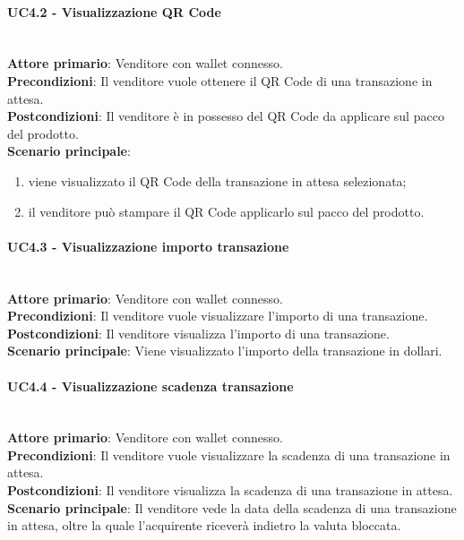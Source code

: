 \documentclass[a4paper, 12pt]{article}
\begin{document}
\paragraph{UC4.2 - Visualizzazione QR Code}\\
\textbf{Attore primario}: Venditore con wallet connesso.\\
\textbf{Precondizioni}: Il venditore vuole ottenere il QR Code di una transazione in attesa.\\
\textbf{Postcondizioni}: Il venditore è in possesso del QR Code da applicare sul pacco del prodotto.\\
\textbf{Scenario principale}:
\begin{enumerate}
\item viene visualizzato il QR Code della transazione in attesa selezionata;
\item il venditore può stampare il QR Code applicarlo sul pacco del prodotto.
\end{enumerate}

\paragraph{UC4.3 - Visualizzazione importo transazione}\\
\textbf{Attore primario}: Venditore con wallet connesso.\\
\textbf{Precondizioni}: Il venditore vuole visualizzare l'importo di una transazione.\\
\textbf{Postcondizioni}: Il venditore visualizza l'importo di una transazione.\\
\textbf{Scenario principale}: Viene visualizzato l'importo della transazione in dollari.\\

\paragraph{UC4.4 - Visualizzazione scadenza transazione}\\
\textbf{Attore primario}: Venditore  con wallet connesso.\\
\textbf{Precondizioni}: Il venditore vuole visualizzare la scadenza di una transazione in attesa.\\
\textbf{Postcondizioni}: Il venditore visualizza la scadenza di una transazione in attesa.\\
\textbf{Scenario principale}: Il venditore vede la data della scadenza di una transazione in attesa, oltre la quale l'acquirente riceverà indietro la valuta bloccata.\\
\end{document}

